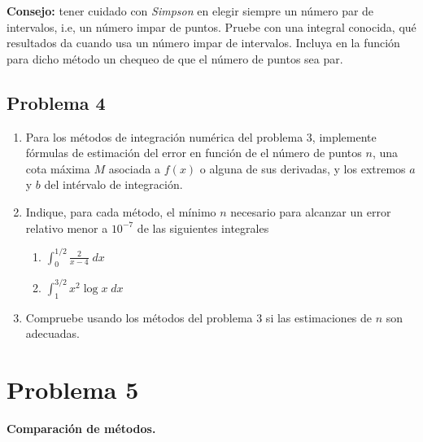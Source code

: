 \documentclass[11pt]{article}
\begin{document}
\textbf{Consejo:} tener cuidado con \emph{Simpson} en elegir siempre un
número par de intervalos, i.e, un número impar de puntos. Pruebe con una
integral conocida, qué resultados da cuando usa un número impar de
intervalos. Incluya en la función para dicho método un chequeo de que el
número de puntos sea par.

    \hypertarget{problema-4}{%
\subsection*{Problema 4}\label{problema-4}}

\begin{enumerate}
\def\labelenumi{\arabic{enumi}.}
\item
  Para los métodos de integración numérica del problema 3, implemente
  fórmulas de estimación del error en función de el número de puntos
  \(n\), una cota máxima \(M\) asociada a \(f(x)\) o alguna de sus
  derivadas, y los extremos \(a\) y \(b\) del intérvalo de integración.
\item
  Indique, para cada método, el mínimo \(n\) necesario para alcanzar un
  error relativo menor a \(10^{-7}\) de las siguientes integrales

  \begin{enumerate}
  \def\labelenumii{\alph{enumii}.}
  \item
    \(\int_0^{1/2} \frac{2}{x-4} \; dx\)
  \item
    \(\int_1^{3/2} x^2 \log x \; dx\)
  \end{enumerate}
\item
  Compruebe usando los métodos del problema 3 si las estimaciones de
  \(n\) son adecuadas.
\end{enumerate}

    \hypertarget{problema-5}{%
\section*{Problema 5}\label{problema-5}}

\textbf{Comparación de métodos.}
\end{document}
